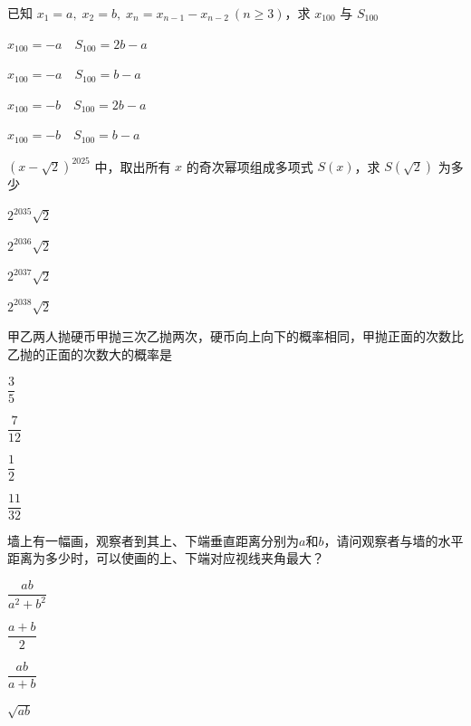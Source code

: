 \documentclass{exam-zh}
\begin{document}
\begin{question}
已知 $x_1=a,\;x_2=b,\;x_n=x_{n-1}-x_{n-2}\ (n\ge3)$，求 $x_{100}$ 与 $S_{100}$ \paren[]
\begin{choices}
  \item $x_{100}=-a\quad S_{100}=2b-a$
  \item $x_{100}=-a\quad S_{100}=b-a$
  \item $x_{100}=-b\quad S_{100}=2b-a$
  \item $x_{100}=-b\quad S_{100}=b-a$
\end{choices}
\end{question}

\begin{question}
$(x-\sqrt{2})^{2025}$ 中，取出所有 $x$ 的奇次幂项组成多项式 $S(x)$，求 $S(\sqrt{2})$ 为多少 \paren[]
\begin{choices}
  \item $2^{2035}\sqrt{2}$
  \item $2^{2036}\sqrt{2}$
  \item $2^{2037}\sqrt{2}$
  \item $2^{2038}\sqrt{2}$
\end{choices}
\end{question}

\begin{question}
甲乙两人抛硬币甲抛三次乙抛两次，硬币向上向下的概率相同，甲抛正面的次数比乙抛的正面的次数大的概率是 \paren[]
\begin{choices}
  \item $\dfrac{3}{5}$
  \item $\dfrac{7}{12}$
  \item $\dfrac{1}{2}$
  \item $\dfrac{11}{32}$
\end{choices}
\end{question}

\begin{question}
墙上有一幅画，观察者到其上、下端垂直距离分别为$a$和$b$，请问观察者与墙的水平距离为多少时，可以使画的上、下端对应视线夹角最大？ \paren[]
\begin{choices}
  \item $\dfrac{ab}{a^2+b^2}$
  \item $\dfrac{a+b}{2}$
  \item $\dfrac{ab}{a+b}$
  \item $\sqrt{ab}$
\end{choices}
\end{question}
\end{document}
